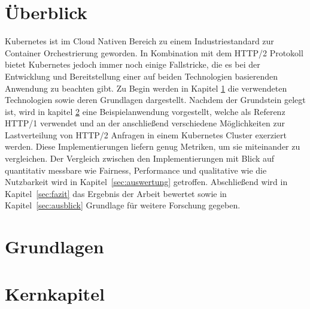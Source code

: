 \documentclass[a4paper,12pt]{article}
\begin{document}

    \frontmatter

    \tableofcontents

    \newpage

    \section*{Überblick}
    Kubernetes ist im Cloud Nativen Bereich zu einem Industriestandard zur Container Orchestrierung geworden.
    In Kombination mit dem HTTP/2 Protokoll bietet Kubernetes jedoch immer noch einige Fallstricke, die es bei der Entwicklung und Bereitstellung einer auf beiden Technologien basierenden Anwendung zu beachten gibt.
    Zu Begin werden in Kapitel \ref{sec:grundlagen} die verwendeten Technologien sowie deren Grundlagen dargestellt.
    Nachdem der Grundstein gelegt ist, wird in kapitel \ref{sec:kernkapitel} eine Beispielanwendung vorgestellt, welche als Referenz HTTP/1 verwendet und an der anschließend verschiedene Möglichkeiten zur Lastverteilung von HTTP/2 Anfragen in einem Kubernetes Cluster exerziert werden.
    Diese Implementierungen liefern genug Metriken, um sie miteinander zu vergleichen.
    Der Vergleich zwischen den Implementierungen mit Blick auf quantitativ messbare wie Fairness, Performance und qualitative wie die Nutzbarkeit wird in Kapitel~\ref{sec:auswertung} getroffen.
    Abschließend wird in Kapitel~\ref{sec:fazit} das Ergebnis der Arbeit bewertet sowie in Kapitel~\ref{sec:ausblick} Grundlage für weitere Forschung gegeben.
    \newpage

    \mainmatter

    \section{Grundlagen}\label{sec:grundlagen}
    

    \section{Kernkapitel}\label{sec:kernkapitel}
    
\end{document}
